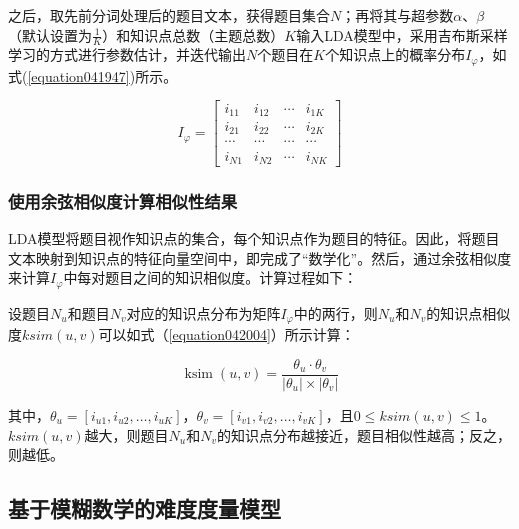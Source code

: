 之后，取先前分词处理后的题目文本，获得题目集合$N$；再将其与超参数$\alpha$、$\beta$（默认设置为$\frac{1}{K}$）和知识点总数（主题总数）$K$输入LDA模型中，采用吉布斯采样学习的方式进行参数估计，并迭代输出$N$个题目在$K$个知识点上的概率分布$I_{\varphi}$，如式(\ref{equation041947})所示。

\begin{equation}
    \label{equation041947}
    I_{\varphi}=\left[\begin{array}{cccc}
        i_{11} & i_{12} & \cdots & i_{1 K} \\
        i_{21} & i_{22} & \cdots & i_{2 K} \\
        \cdots & \cdots & \cdots & \cdots \\
        i_{N 1} & i_{N 2} & \cdots & i_{N K}
        \end{array}\right]
\end{equation}

\subsubsection{使用余弦相似度计算相似性结果}

LDA模型将题目视作知识点的集合，每个知识点作为题目的特征。因此，将题目文本映射到知识点的特征向量空间中，即完成了“数学化”。然后，通过余弦相似度来计算$I_{\varphi}$中每对题目之间的知识相似度。计算过程如下：

设题目$N_{u}$和题目$N_{v}$对应的知识点分布为矩阵$I_{\varphi}$中的两行，则$N_{u}$和$N_{v}$的知识点相似度$ksim(u,v)$可以如式（\ref{equation042004}）所示计算：

\begin{equation}
\label{equation042004}
\operatorname{ksim}(u, v)=\frac{\theta_{u} \cdot \theta_{v}}{\left|\theta_{u}\right| \times\left|\theta_{v}\right|}
\end{equation}

其中，$\theta_{u} = \left [ i_{u1},i_{u2}, \dots, i_{uK} \right ] $，$\theta_{v} = \left [ i_{v1},i_{v2}, \dots, i_{vK} \right ] $，且$0 \le ksim(u,v) \le 1$。$ksim(u,v)$越大，则题目$N_{u}$和$N_{v}$的知识点分布越接近，题目相似性越高；反之，则越低。

\subsection{基于模糊数学的难度度量模型}


